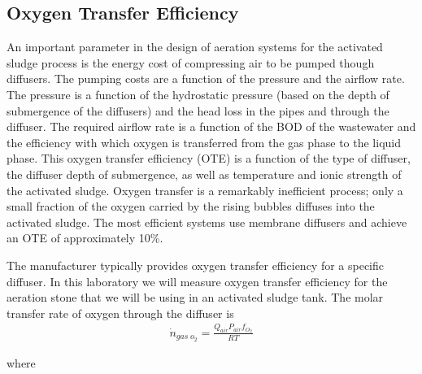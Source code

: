 \documentclass[letterpaper,10pt,english]{sphinxmanual}
\begin{document}
\subsection{Oxygen Transfer Efficiency}
\label{\detokenize{Gas_Transfer/Gas_Transfer:oxygen-transfer-efficiency}}\label{\detokenize{Gas_Transfer/Gas_Transfer:heading-gas-transfer-oxygen-transfer-efficiency}}
An important parameter in the design of aeration systems for the activated sludge process is the energy cost of compressing air to be pumped though diffusers. The pumping costs are a function of the pressure and the airflow rate. The pressure is a function of the hydrostatic pressure (based on the depth of submergence of the diffusers) and the head loss in the pipes and through the diffuser. The required airflow rate is a function of the BOD of the wastewater and the efficiency with which oxygen is transferred from the gas phase to the liquid phase. This oxygen transfer efficiency (OTE) is a function of the type of diffuser, the diffuser depth of submergence, as well as temperature and ionic strength of the activated sludge. Oxygen transfer is a remarkably inefficient process; only a small fraction of the oxygen carried by the rising bubbles diffuses into the activated sludge. The most efficient systems use membrane diffusers and achieve an OTE of approximately 10\%.

The manufacturer typically provides oxygen transfer efficiency for a specific diffuser. In this laboratory we will measure oxygen transfer efficiency for the aeration stone that we will be using in an activated sludge tank. The molar transfer rate of oxygen through the diffuser is
\begin{equation}\label{equation:Gas_Transfer/Gas_Transfer:eq_Gas_air_supply}
\begin{split} \dot{n}_{gas\; o_{2} } =\frac{Q_{air} P_{air} f_{O_{2} } }{RT}\end{split}
\end{equation}\begin{description}
\item[{where}] \leavevmode
{}

\end{description}
\end{document}
